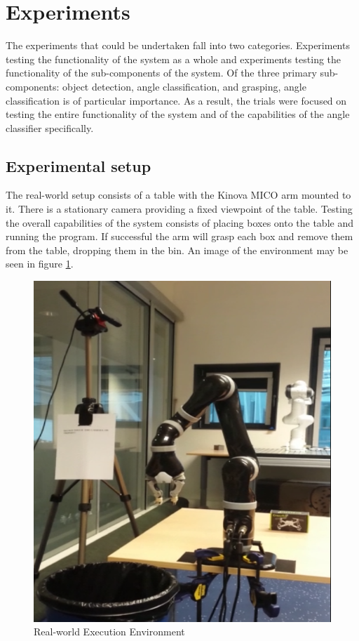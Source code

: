 \documentclass[letterpaper, 10 pt, conference]{conf/ieeeconf}  %
\begin{document}
\section{Experiments}
\label{sec:experiments}
The experiments that could be undertaken fall into two categories. Experiments
testing the functionality of the system as a whole and experiments testing the
functionality of the sub-components of the system. Of the three primary
sub-components: object detection, angle classification, and grasping, angle
classification is of particular importance. As a result, the trials were focused
on testing the entire functionality of the system and of the capabilities of the
angle classifier specifically.

\subsection{Experimental setup}
The real-world setup consists of a table with the Kinova MICO arm mounted to it.
There is a stationary camera providing a fixed viewpoint of the table. Testing
the overall capabilities of the system consists of placing boxes onto the table
and running the program. If successful the arm will grasp each box and remove
them from the table, dropping them in the bin. An image of the environment may
be seen in figure \ref{fig:real_environment}.

\begin{figure}[ht]
  \centering
  \includegraphics[width=0.8\linewidth]{real_environment.png}
  \caption{\label{fig:real_environment} Real-world Execution Environment}
\end{figure}
\end{document}
